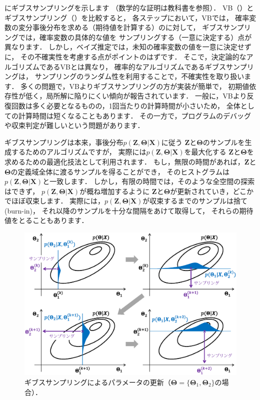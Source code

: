 にギブスサンプリングを示します
（数学的な証明は教科書\cite{bishop}を参照）．
VB（）とギブスサンプリング（）を比較すると，
各ステップにおいて，VBでは，
確率変数の変分事後分布を求める（期待値を計算する）のに対して，
ギブスサンプリングでは，確率変数の具体的な値を
サンプリングする（一意に決定する）点が異なります．
しかし，ベイズ推定では，未知の確率変数の値を一意に決定せずに，
その不確実性を考慮する点がポイントのはずです．
そこで，決定論的なアルゴリズムであるVBとは異なり，
確率的なアルゴリズムであるギブスサンプリングは，
サンプリングのランダム性を利用することで，不確実性を取り扱います．
多くの問題で，VBよりギブスサンプリングの方が実装が簡単で，
初期値依存性が低く，局所解に陥りにくい傾向が報告されています．
一般に，VBより反復回数は多く必要となるものの，1回当たりの計算時間が小さいため，
全体としての計算時間は短くなることもあります．
その一方で，プログラムのデバッグや収束判定が難しいという問題があります．

ギブスサンプリングは本来，事後分布$p(\bm{Z},\bm\Theta|\bm{X})$に従う
$\bm{Z}$と$\bm\Theta$のサンプルを生成するためのアルゴリズムですが，
実際には$p(\bm{Z},\bm\Theta|\bm{X})$を最大化する
$\bm{Z}$と$\bm\Theta$を求めるための最適化技法として利用されます．
もし，無限の時間があれば，$\bm{Z}$と$\bm\Theta$の定義域全体に渡るサンプルを得ることができ，
そのヒストグラムは$p(\bm{Z},\bm\Theta|\bm{X})$と一致します．
しかし，有限の時間では，そのような全空間の探索はできず，
$p(\bm{Z},\bm\Theta|\bm{X})$が概ね増加するように
$\bm{Z}$と$\bm\Theta$が更新されていき，どこかでほぼ収束します．
実際には，$p(\bm{Z},\bm\Theta|\bm{X})$が収束するまでのサンプルは捨て (burn-in)，
それ以降のサンプルを十分な間隔をあけて取得して，
それらの期待値をとることもあります．

\begin{figure}[t]
\centering
\includegraphics[width=.98\linewidth]{sections/optimization/gibbs_sampling}
\caption{ギブスサンプリングによるパラメータの更新（$\bm\Theta=\{\bm\Theta_1,\bm\Theta_2\}$の場合）．}
\label{fig:gibbs_sampling}
\end{figure}

